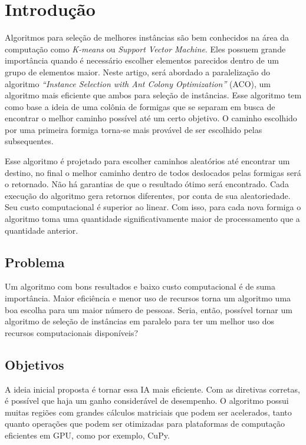 \section{Introdução}
Algoritmos para seleção de melhores instâncias são bem conhecidos na área da computação como \emph{K-means} ou \emph{Support
Vector Machine}. Eles possuem grande importância quando é necessário escolher elementos parecidos dentro de um grupo de elementos
maior. Neste artigo, será abordado a paralelização do algoritmo \emph{``Instance Selection with Ant Colony Optimization''} (ACO),
um algoritmo mais eficiente que ambos para seleção de instâncias.
Esse algoritmo tem como base a ideia de uma colônia de formigas que se separam em busca de encontrar o melhor caminho
possível até um certo objetivo. O caminho escolhido por uma primeira formiga torna-se mais provável de ser escolhido
pelas subsequentes.

Esse algoritmo é projetado para escolher caminhos aleatórios até encontrar um destino, no final o melhor caminho dentro de todos deslocados pelas formigas
será o retornado. Não há garantias de que o resultado ótimo será encontrado. Cada execução do algoritmo gera retornos diferentes, por conta
de sua aleatoriedade. Seu custo computacional é superior ao linear. Com isso, para cada nova formiga o algoritmo toma uma quantidade
significativamente maior de processamento que a quantidade anterior.

\subsection{Problema}
Um algoritmo com bons resultados e baixo custo computacional é de suma importância. Maior eficiência e menor uso de recursos
torna um algoritmo uma boa escolha para um maior número de pessoas. Seria, então, possível tornar um algoritmo de seleção de
instâncias em paralelo para ter um melhor uso dos recursos computacionais disponíveis?


\subsection{Objetivos}

A ideia inicial proposta é tornar essa IA mais eficiente. Com as diretivas corretas, é possível que haja um ganho considerável de
desempenho. O algoritmo possui muitas regiões com grandes cálculos matriciais que podem ser acelerados, tanto quanto operações que
podem ser otimizadas para plataformas de computação eficientes em GPU, como por exemplo, {CuPy}.

